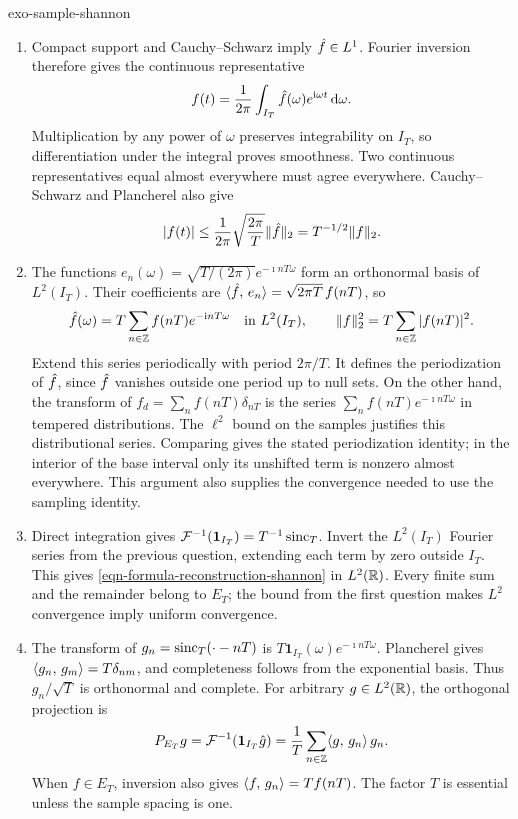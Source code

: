 \begin{correction}{exo-sample-shannon}
\begin{enumerate}
\item Compact support and Cauchy--Schwarz imply $\hat{f}\in L^1$.
Fourier inversion therefore gives the continuous representative
\[
 f(t)=\frac1{2\pi}\int_{I_T}\hat{f}(\omega)e^{\mathrm{i}\omega t}\,\mathrm{d}\omega.
\]
Multiplication by any power of $\omega$ preserves integrability on $I_T$,
so differentiation under the integral proves smoothness. Two continuous
representatives equal almost everywhere must agree everywhere.
Cauchy--Schwarz and Plancherel also give
\[
 |f(t)|\leq\frac1{2\pi}\sqrt{\frac{2\pi}T}\lVert\hat{f}\rVert_2
         =T^{-1/2}\lVert f\rVert_2.
\]
\item The functions $e_n(\omega)=\sqrt{T/(2\pi)}e^{-\imath nT\omega}$
form an orthonormal basis of $L^2(I_T)$.
Their coefficients are
$\langle \hat{f},\,e_n\rangle=\sqrt{2\pi T}\,f(nT)$, so
\[
 \hat{f}(\omega)=T\sum_{n\in\mathbb{Z}}f(nT)e^{-\mathrm{i} nT\omega}
 \quad\text{in }L^2(I_T),\qquad
 \lVert f\rVert_2^2=T\sum_{n\in\mathbb{Z}}|f(nT)|^2.
\]
Extend this series periodically with period $2\pi/T$.
It defines the periodization of $\hat{f}$, since $\hat{f}$ vanishes outside
one period up to null sets. On the other hand, the transform of
$f_d=\sum_nf(nT)\delta_{nT}$ is the series
$\sum_nf(nT)e^{-\imath nT\omega}$ in tempered distributions.
The $\ell^2$ bound on the samples justifies this distributional series.
Comparing gives the stated periodization identity; in the interior of the
base interval only its unshifted term is nonzero almost everywhere.
This argument also supplies the convergence needed to use the sampling identity.
\item Direct integration gives
$\mathcal{F}^{-1}(\mathbf1_{I_T})=T^{-1}\operatorname{sinc}_T$.
Invert the $L^2(I_T)$ Fourier series from the previous question, extending
each term by zero outside $I_T$. This gives
\eqref{eqn-formula-reconstruction-shannon} in $L^2(\mathbb{R})$.
Every finite sum and the remainder belong to $E_T$; the bound from the
first question makes $L^2$ convergence imply uniform convergence.
\item The transform of $g_n=\operatorname{sinc}_T(\cdot-nT)$ is
$T\mathbf1_{I_T}(\omega)e^{-\imath nT\omega}$.
Plancherel gives $\langle g_n,\,g_m\rangle=T\delta_{nm}$, and completeness follows
from the exponential basis. Thus $g_n/\sqrt T$ is orthonormal and complete.
For arbitrary $g\in L^2(\mathbb{R})$, the orthogonal projection is
\[
 P_{E_T}g=\mathcal{F}^{-1}(\mathbf1_{I_T}\hat{g})
         =\frac1T\sum_{n\in\mathbb{Z}}\langle g,\,g_n\rangle\,g_n.
\]
When $f\in E_T$, inversion also gives $\langle f,\,g_n\rangle=T f(nT)$.
The factor $T$ is essential unless the sample spacing is one.
\end{enumerate}
\end{correction}
